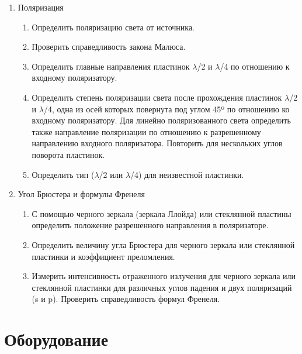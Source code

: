 \documentclass[a4paper, 12pt]{article}
\begin{document}
\begin{enumerate}
	
	\item Поляризация

\begin{enumerate}


	\item Определить поляризацию света от источника.

	\item Проверить справедливость закона Малюса.

	\item Определить главные направления пластинок $\lambda$/2 и  $\lambda$/4 по отношению к входному поляризатору.

	\item Определить степень поляризации света после прохождения пластинок $\lambda$/2 и  $\lambda$/4, одна из осей которых повернута под углом 45º по отношению ко входному поляризатору. Для линейно поляризованного света определить также направление поляризации по отношению к разрешенному направлению входного поляризатора. Повторить для нескольких углов поворота пластинок.

	\item Определить тип ($\lambda$/2 или $\lambda$/4) для неизвестной пластинки.

\end{enumerate}

	\item Угол Брюстера и формулы Френеля

\begin{enumerate}

	\item С помощью черного зеркала (зеркала Ллойда) или стеклянной пластины определить положение разрешенного направления в поляризаторе.

	\item Определить величину угла Брюстера для черного зеркала или стеклянной пластинки и коэффициент преломления.

	\item Измерить интенсивность отраженного излучения для черного зеркала или стеклянной пластинки для различных углов падения и двух поляризаций (s и p). Проверить справедливость формул Френеля. 

\end{enumerate}
\end{enumerate}

\section{Оборудование}
\end{document}
